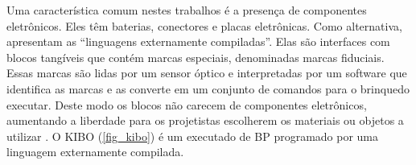 Uma característica comum nestes trabalhos é a presença de componentes eletrônicos. Eles têm baterias, conectores e placas eletrônicas. Como alternativa,  apresentam as “linguagens externamente compiladas”. Elas são interfaces com blocos tangíveis que contém marcas especiais, denominadas marcas fiduciais. Essas marcas são lidas por um sensor óptico e interpretadas por um software que identifica as marcas e as converte em um conjunto de comandos para o brinquedo executar. Deste modo os blocos não carecem de componentes eletrônicos, aumentando a liberdade para os projetistas escolherem os materiais ou objetos a utilizar . O KIBO \cite{sullivan_kibo_2015} (\autoref{fig_kibo}) é um executado de \ac{BP} programado por uma linguagem externamente compilada.


